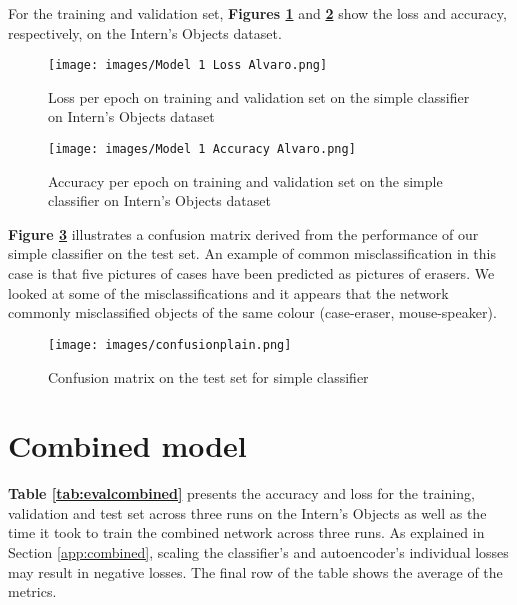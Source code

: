 \documentclass{l4proj}
\begin{document}
\begin{table}[H]
\caption{Evaluation of a simple classifier on Intern's Objects dataset across three runs. Last row outlines the average of each metric}
\label{tab:evalclass}
\end{table}

For the training and validation set, \textbf{Figures \ref{fig:plainloss}} and \textbf{\ref{fig:plainaccuracy}} show the loss and accuracy, respectively, on the Intern's Objects dataset.

\begin{figure}[H]
    \centering
    \texttt{[image: images/Model 1 Loss Alvaro.png]}
    \caption{Loss per epoch on training and validation set on the simple classifier on Intern's Objects dataset}
    \label{fig:plainloss} 
\end{figure}

\begin{figure} [H]
    \centering
    \texttt{[image: images/Model 1 Accuracy Alvaro.png]}
    \caption{Accuracy per epoch on training and validation set on the simple classifier on Intern's Objects dataset}
    \label{fig:plainaccuracy} 
\end{figure}

\textbf{Figure \ref{fig:confusionplain}} illustrates a confusion matrix derived from the performance of our simple classifier on the test set. An example of common misclassification in this case is that five pictures of cases have been predicted as pictures of erasers. We looked at some of the misclassifications and it appears that the network commonly misclassified objects of the same colour (case-eraser, mouse-speaker).

\begin{figure}[H]
    \centering
    \texttt{[image: images/confusionplain.png]}
    \caption{Confusion matrix on the test set for simple classifier}
    \label{fig:confusionplain} 
\end{figure}

\section{Combined model}
\textbf{Table \ref{tab:evalcombined}} presents the accuracy and loss for the training, validation and test set across three runs on the Intern's Objects as well as the time it took to train the combined network across three runs. As explained in Section \ref{app:combined}, scaling the classifier's and autoencoder's individual losses may result in negative losses.
The final row of the table shows the average of the metrics.
\end{document}
